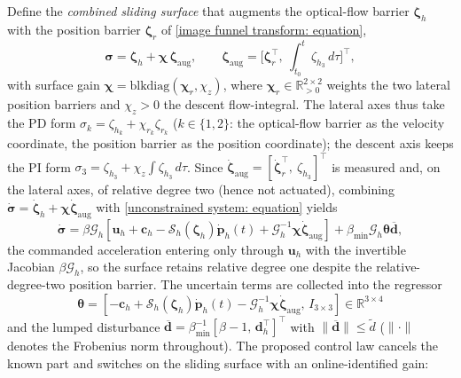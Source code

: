 \documentclass{IEEEtaes}
\begin{document}
Define the \emph{combined sliding surface} that augments the optical-flow barrier $\boldsymbol{\zeta}_h$ with the position barrier $\boldsymbol{\zeta}_r$ of \eqref{image funnel transform: equation},
\begin{equation} \label{sliding surface: equation}
    \boldsymbol{\sigma} = \boldsymbol{\zeta}_h + \boldsymbol{\chi}\,\boldsymbol{\zeta}_\text{aug},\qquad \boldsymbol{\zeta}_\text{aug}=\big[\boldsymbol{\zeta}_r^\top,\ \textstyle\int_{t_0}^{t}\zeta_{h_3}\,d\tau\big]^\top,
\end{equation}
with surface gain $\boldsymbol{\chi}=\text{blkdiag}(\boldsymbol{\chi}_r,\chi_z)$, where $\boldsymbol{\chi}_r\in\mathbb{R}^{2\times2}_{>0}$ weights the two lateral position barriers and $\chi_z>0$ the descent flow-integral. The lateral axes thus take the PD form $\sigma_k=\zeta_{h_k}+\chi_{r_k}\zeta_{r_k}$ ($k\in\{1,2\}$: the optical-flow barrier as the velocity coordinate, the position barrier as the position coordinate); the descent axis keeps the PI form $\sigma_3=\zeta_{h_3}+\chi_z\!\int\zeta_{h_3}\,d\tau$. Since $\dot{\boldsymbol{\zeta}}_\text{aug}=[\dot{\boldsymbol{\zeta}}_r^\top,\ \zeta_{h_3}]^\top$ is measured and, on the lateral axes, of relative degree two (hence not actuated), combining $\dot{\boldsymbol{\sigma}}=\dot{\boldsymbol{\zeta}}_h+\boldsymbol{\chi}\dot{\boldsymbol{\zeta}}_\text{aug}$ with \eqref{unconstrained system: equation} yields
\begin{equation} \label{sigma derivative: equation 2}
    \dot{\boldsymbol{\sigma}} = \beta\mathcal{G}_h\!\left[\boldsymbol{u}_h+\boldsymbol{c}_h-\mathcal{S}_h(\boldsymbol{\zeta}_h)\dot{\boldsymbol{p}}_h(t)+\mathcal{G}_h^{-1}\boldsymbol{\chi}\dot{\boldsymbol{\zeta}}_\text{aug}\right] + \beta_{\min}\mathcal{G}_h\boldsymbol{\theta}\boldsymbol{\overline{d}},
\end{equation}
the commanded acceleration entering only through $\boldsymbol{u}_h$ with the invertible Jacobian $\beta\mathcal{G}_h$, so the surface retains relative degree one despite the relative-degree-two position barrier. The uncertain terms are collected into the regressor
\begin{equation} \label{regressor: equation}
    \boldsymbol{\theta} = [-\boldsymbol{c}_h+\mathcal{S}_h(\boldsymbol{\zeta}_h)\dot{\boldsymbol{p}}_h(t)-\mathcal{G}_h^{-1}\boldsymbol{\chi}\dot{\boldsymbol{\zeta}}_\text{aug},\,I_{3\times 3}]\in\mathbb{R}^{3\times 4}
\end{equation}
and the lumped disturbance $\boldsymbol{\overline{d}}=\beta_{\min}^{-1}[\beta-1,\,\boldsymbol{d}_h^\top]^\top$ with $\|\boldsymbol{\overline{d}}\|\le\tilde{d}$ ($\|\cdot\|$ denotes the Frobenius norm throughout). The proposed control law cancels the known part and switches on the sliding surface with an online-identified gain:
\end{document}
